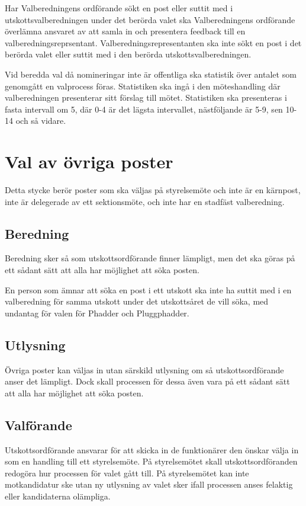 \documentclass{dsekprotokoll}
\begin{document}
Har Valberedningens ordförande sökt en post eller suttit med i utskottsvalberedningen under det berörda valet ska Valberedningens ordförande överlämna ansvaret av att samla in och presentera
feedback till en valberedningsreprsentant. Valberedningsrepresentanten ska inte sökt en
post i det berörda valet eller suttit med i den berörda utskottsvalberedningen.

Vid beredda val då nomineringar inte är offentliga ska statistik över antalet som genomgått en valprocess föras. Statistiken ska ingå i den möteshandling där valberedningen presenterar sitt förslag till mötet. Statistiken ska presenteras i fasta intervall om 5, där 0-4
är det lägsta intervallet, nästföljande är 5-9, sen 10-14 och så
vidare.

\section{Val av övriga poster}

Detta stycke berör poster som ska väljas på styrelsemöte och inte är en kärnpost, inte är
delegerade av ett sektionsmöte, och inte har en stadfäst valberedning.

\subsection*{Beredning}

Beredning sker så som utskottsordförande finner lämpligt, men det ska göras på ett sådant sätt att alla har möjlighet att söka posten.

En person som ämnar att söka en post i ett utskott ska inte ha suttit med i en valberedning för samma utskott under det utskottsåret de vill söka, med undantag för valen för Phadder och Pluggphadder.

\subsection*{Utlysning}

Övriga poster kan väljas in utan särskild utlysning om så utskottsordförande anser det lämpligt. Dock skall processen för dessa även vara på ett sådant sätt att alla har möjlighet att söka posten.

\subsection*{Valförande}

Utskottsordförande ansvarar för att skicka in de funktionärer den önskar välja in som en handling
till ett styrelsemöte. På styrelsemötet skall utskottsordföranden redogöra hur processen för valet
gått till. På styrelsemötet kan inte motkandidatur ske utan ny utlysning av valet sker ifall processen
anses felaktig eller kandidaterna olämpliga.
\end{document}
